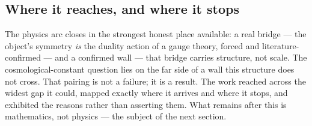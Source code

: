 \subsection{Where it reaches, and where it stops}

The physics arc closes in the strongest honest place available: a real bridge --- the
object's symmetry \emph{is} the duality action of a gauge theory, forced and
literature-confirmed --- and a confirmed wall --- that bridge carries structure, not
scale. The cosmological-constant question lies on the far side of a wall this structure
does not cross. That pairing is not a failure; it is a result. The work reached across the
widest gap it could, mapped exactly where it arrives and where it stops, and exhibited the
reasons rather than asserting them. What remains after this is mathematics, not physics ---
the subject of the next section.
